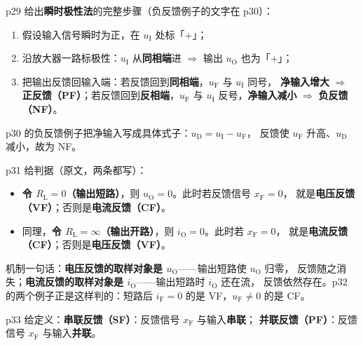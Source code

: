 \documentclass[11pt]{ctexart}
\begin{document}
p29 给出\textbf{瞬时极性法}的完整步骤（负反馈例子的文字在 p30）：

\begin{enumerate}
\item 假设输入信号瞬时为正，在 $u_{\mathrm{I}}$ 处标「$+$」；
\item 沿放大器一路标极性：$u_{\mathrm{I}}$ 从\textbf{同相端}进 $\Rightarrow$ 输出 $u_{\mathrm{O}}$ 也为「$+$」；
\item 把输出反馈回输入端：若反馈回到\textbf{同相端}，$u_{\mathrm{F}}$ 与 $u_{\mathrm{I}}$ 同号，
\textbf{净输入增大} $\Rightarrow$ \textbf{正反馈（PF）}；若反馈回到\textbf{反相端}，$u_{\mathrm{F}}$ 与
$u_{\mathrm{I}}$ 反号，\textbf{净输入减小} $\Rightarrow$ \textbf{负反馈（NF）}。
\end{enumerate}

p30 的负反馈例子把净输入写成具体式子：$u_{\mathrm{D}}=u_{\mathrm{I}}-u_{\mathrm{F}}$，
反馈使 $u_{\mathrm{F}}$ 升高、$u_{\mathrm{D}}$ 减小，故为 NF。



p31 给判据（原文，两条都写）：

\begin{itemize}
\item \textbf{令 $R_{\mathrm{L}}=0$（输出短路）}，则 $u_{\mathrm{O}}=0$。此时若反馈信号 $x_{\mathrm{F}}=0$，
就是\textbf{电压反馈（VF）}；否则是\textbf{电流反馈（CF）}。
\item 同理，\textbf{令 $R_{\mathrm{L}}=\infty$（输出开路）}，则 $i_{\mathrm{O}}=0$。此时若 $x_{\mathrm{F}}=0$，
就是\textbf{电流反馈（CF）}；否则是\textbf{电压反馈（VF）}。
\end{itemize}

机制一句话：\textbf{电压反馈的取样对象是 $u_{\mathrm{O}}$}——输出短路使 $u_{\mathrm{O}}$ 归零，
反馈随之消失；\textbf{电流反馈的取样对象是 $i_{\mathrm{O}}$}——输出短路时 $i_{\mathrm{O}}$ 还在流，
反馈依然存在。p32 的两个例子正是这样判的：短路后 $i_{\mathrm{F}}=0$ 的是 VF，$u_{\mathrm{F}}\neq0$ 的是 CF。


p33 给定义：\textbf{串联反馈（SF）}：反馈信号 $x_{\mathrm{F}}$ 与输入\textbf{串联}；
\textbf{并联反馈（PF）}：反馈信号 $x_{\mathrm{F}}$ 与输入\textbf{并联}。
\end{document}
